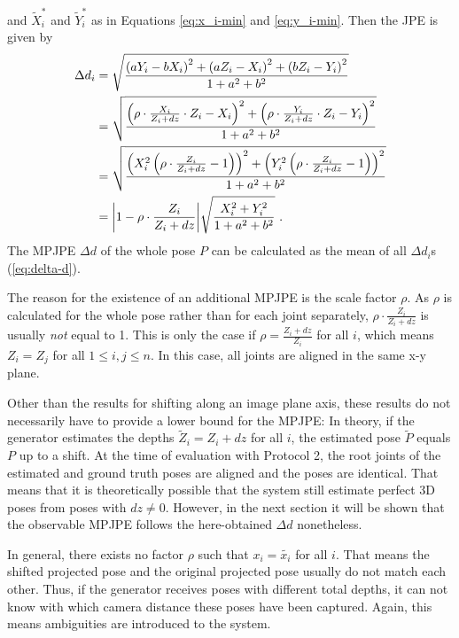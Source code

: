 and $\widetilde{X}_i^\ast$ and $\widetilde{Y}_i^\ast$ as in Equations \eqref{eq:x_i-min} and \eqref{eq:y_i-min}.
Then the JPE  is given by 
\begin{align}
	\label{eq:z-shift-error}
	\Delta d_i &= \sqrt{\frac{\left (a Y_i - b X_i \right )^2 + \left (a Z_i - X_i \right )^2 + \left (b Z_i - Y_i \right )^2}{1 + a^2 + b^2}} \\ 
	&= \sqrt{\frac{\left (\rho \cdot \frac{X_i}{Z_i + dz}\cdot Z_i - X_i \right )^2 + \left (\rho \cdot \frac{Y_i }{Z_i + dz}\cdot Z_i- Y_i \right )^2}{1 + a^2 + b^2}} \\
	&= \sqrt{\frac{\left (X_i^2 \left (\rho \cdot \frac{Z_i}{Z_i + dz} - 1 \right) \right )^2 + \left (Y_i^2 \left (\rho \cdot \frac{Z_i}{Z_i + dz}-1 \right ) \right )^2}{1 + a^2 + b^2}} \\
	&= \abs{1 - \rho \cdot \frac{Z_i}{Z_i + dz}}  \sqrt{\frac{X_i^2 + Y_i^2}{1 + a^2 + b^2}}\ .
\end{align}
The MPJPE $\Delta d$ of the whole pose $P$ can be calculated as the mean of all $\Delta d_i$s (\autoref{eq:delta-d}).

The reason for the existence of an additional MPJPE is the scale factor $\rho$.
As $\rho$ is calculated for the whole pose rather than for each joint separately, $\rho \cdot \frac{Z_i}{Z_i + dz}$ is usually \emph{not} equal to 1.
This is only the case if $\rho = \frac{Z_i + dz}{Z_i}$ for all $i$, which means $Z_i = Z_j$ for all $1 \leq i, j \leq n$.
In this case, all joints are aligned in the same x-y plane.

Other than the results for shifting along an image plane axis, these results do not necessarily have to provide a lower bound for the MPJPE:
In theory, if the generator estimates the depths $\widetilde{Z}_i = Z_i + dz$ for all $i$, the estimated pose $\widetilde{P}$ equals $P$ up to a shift.
At the time of evaluation with Protocol 2, the root joints of the estimated and ground truth poses are aligned and the poses are identical.
That means that it is theoretically possible that the system still estimate perfect 3D poses from poses with $dz \neq 0$.
However, in the next section it will be shown that the observable MPJPE follows the here-obtained $\Delta d$ nonetheless.

In general, there exists no factor $\rho$ such that $x_i = \widetilde{x_i}$ for all $i$.
That means the shifted projected pose and the original projected pose usually do not match each other.
Thus, if the generator receives poses with different total depths, it can not know with which camera distance these poses have been captured.
Again, this means ambiguities are introduced to the system.

